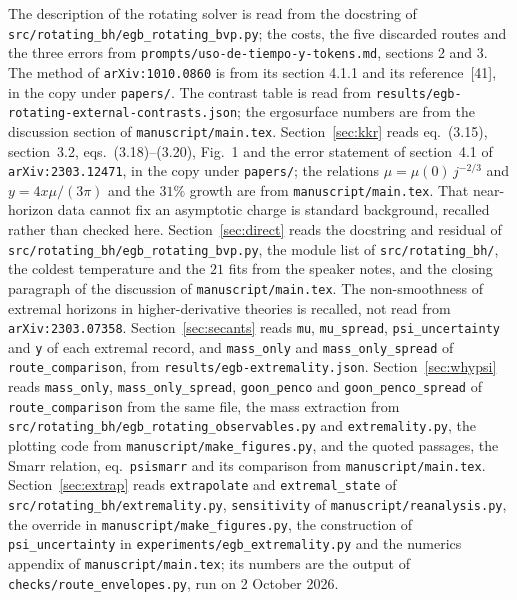 \documentclass[11pt,a4paper]{article}
\begin{document}
The description of the rotating solver is read from the docstring of
\texttt{src/rotating\_bh/egb\_rotating\_bvp.py}; the costs, the five discarded
routes and the three errors from \texttt{prompts/uso-de-tiempo-y-tokens.md},
sections 2 and 3. The method of \texttt{arXiv:1010.0860} is from its section
4.1.1 and its reference~[41], in the copy under \texttt{papers/}. The contrast
table is read from
\texttt{results/egb-rotating-external-contrasts.json}; the ergosurface numbers
are from the discussion section of \texttt{manuscript/main.tex}.
Section~\ref{sec:kkr} reads eq.~(3.15), section~3.2, eqs.~(3.18)--(3.20),
Fig.~1 and the error statement of section~4.1 of \texttt{arXiv:2303.12471}, in
the copy under \texttt{papers/}; the relations $\mu=\mu(0)\,j^{-2/3}$ and
$y=4x\mu/(3\pi)$ and the $31\%$ growth are from \texttt{manuscript/main.tex}.
That near-horizon data cannot fix an asymptotic charge is standard background,
recalled rather than checked here.
Section~\ref{sec:direct} reads the docstring and residual of
\texttt{src/rotating\_bh/egb\_rotating\_bvp.py}, the module list of
\texttt{src/rotating\_bh/}, the coldest temperature and the $21$ fits from the
speaker notes, and the closing paragraph of the discussion of
\texttt{manuscript/main.tex}. The non-smoothness of extremal horizons in
higher-derivative theories is recalled, not read from
\texttt{arXiv:2303.07358}.
Section~\ref{sec:secants} reads \texttt{mu}, \texttt{mu\_spread},
\texttt{psi\_uncertainty} and \texttt{y} of each extremal record, and
\texttt{mass\_only} and \texttt{mass\_only\_spread} of
\texttt{route\_comparison}, from \texttt{results/egb-extremality.json}.
Section~\ref{sec:whypsi} reads \texttt{mass\_only}, \texttt{mass\_only\_spread},
\texttt{goon\_penco} and \texttt{goon\_penco\_spread} of
\texttt{route\_comparison} from the same file, the mass extraction from
\texttt{src/rotating\_bh/egb\_rotating\_observables.py} and
\texttt{extremality.py}, the plotting code from
\texttt{manuscript/make\_figures.py}, and the quoted passages, the Smarr
relation, eq.~\texttt{psismarr} and its comparison from
\texttt{manuscript/main.tex}.
Section~\ref{sec:extrap} reads \texttt{extrapolate} and \texttt{extremal\_state}
of \texttt{src/rotating\_bh/extremality.py}, \texttt{sensitivity} of
\texttt{manuscript/reanalysis.py}, the override in
\texttt{manuscript/make\_figures.py}, the construction of
\texttt{psi\_uncertainty} in \texttt{experiments/egb\_extremality.py} and the
numerics appendix of \texttt{manuscript/main.tex}; its numbers are the output of
\texttt{checks/route\_envelopes.py}, run on 2 October 2026.
\end{document}
